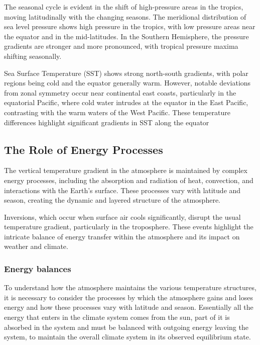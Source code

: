The seasonal cycle is evident in the shift of high-pressure areas in the tropics, moving latitudinally with the changing seasons. The meridional distribution of sea level pressure shows high pressure in the tropics, with low pressure areas near the equator and in the mid-latitudes. In the Southern Hemisphere, the pressure gradients are stronger and more pronounced, with tropical pressure maxima shifting seasonally.

Sea Surface Temperature (SST) shows strong north-south gradients, with polar regions being cold and the equator generally warm. However, notable deviations from zonal symmetry occur near continental east coasts, particularly in the equatorial Pacific, where cold water intrudes at the equator in the East Pacific, contrasting with the warm waters of the West Pacific. These temperature differences highlight significant gradients in SST along the equator

 

\subsection*{The Role of Energy Processes}

The vertical temperature gradient in the atmosphere is maintained by complex energy processes, including the absorption and radiation of heat, convection, and interactions with the Earth's surface. These processes vary with latitude and season, creating the dynamic and layered structure of the atmosphere.

Inversions, which occur when surface air cools significantly, disrupt the usual temperature gradient, particularly in the troposphere. These events highlight the intricate balance of energy transfer within the atmosphere and its impact on weather and climate.

\subsubsection{Energy balances }
To understand how the atmosphere maintains the various temperature structures, it is necessary to consider the processes by which the atmosphere gains and loses energy and how these processes vary with latitude and season. Essentially all the energy that enters in the climate system comes from the sun, part of it is absorbed in the system and must be balanced with outgoing energy leaving the system, to maintain the overall climate system in its observed equilibrium state. 

